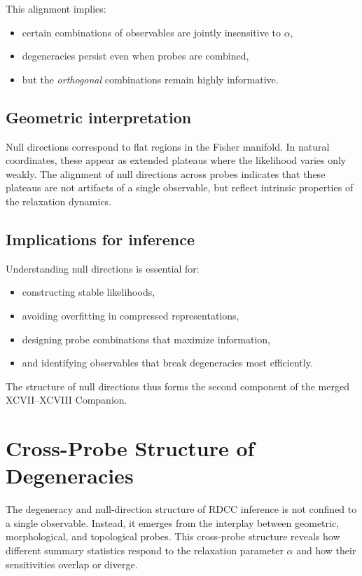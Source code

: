 \documentclass[11pt,a4paper]{article}
\begin{document}
This alignment implies:
\begin{itemize}
    \item certain combinations of observables are jointly insensitive to $\alpha$,
    \item degeneracies persist even when probes are combined,
    \item but the \emph{orthogonal} combinations remain highly informative.
\end{itemize}

\subsection{Geometric interpretation}

Null directions correspond to flat regions in the Fisher manifold. In natural 
coordinates, these appear as extended plateaus where the likelihood varies only 
weakly. The alignment of null directions across probes indicates that these 
plateaus are not artifacts of a single observable, but reflect intrinsic 
properties of the relaxation dynamics.

\subsection{Implications for inference}

Understanding null directions is essential for:
\begin{itemize}
    \item constructing stable likelihoods,
    \item avoiding overfitting in compressed representations,
    \item designing probe combinations that maximize information,
    \item and identifying observables that break degeneracies most efficiently.
\end{itemize}

The structure of null directions thus forms the second component of the merged 
XCVII--XCVIII Companion.
\section{Cross-Probe Structure of Degeneracies}

The degeneracy and null-direction structure of RDCC inference is not confined 
to a single observable. Instead, it emerges from the interplay between 
geometric, morphological, and topological probes. This cross-probe structure 
reveals how different summary statistics respond to the relaxation parameter 
$\alpha$ and how their sensitivities overlap or diverge.
\end{document}
